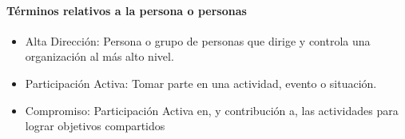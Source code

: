 					\paragraph{Términos relativos a la persona o personas}
						\begin{itemize}
							\item Alta Dirección: Persona o grupo de personas que dirige y controla una organización al más alto nivel.
							
							\item Participación Activa: Tomar parte en una actividad, evento o situación.
							
							\item Compromiso: Participación Activa en, y contribución a, las actividades para lograr objetivos compartidos
						\end{itemize}
					
